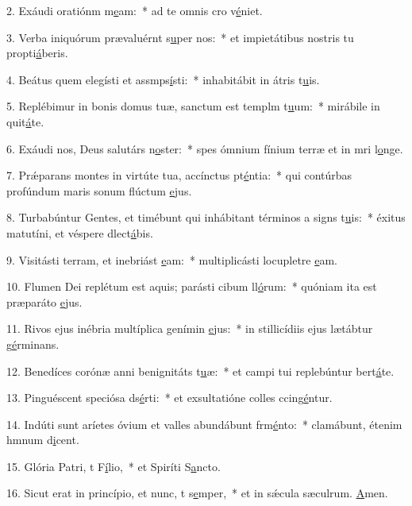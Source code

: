 2. Exáudi oratiónm m\uline{e}am:~* ad te omnis cro v\uline{é}niet.\par 
3. Verba iniquórum prævaluérnt s\uline{u}per nos:~* et impietátibus nostris tu propti\uline{á}beris.\par 
4. Beátus quem elegísti et assmps\uline{í}sti:~* inhabitábit in átris t\uline{u}is.\par 
5. Replébimur in bonis domus tuæ, sanctum est templm t\uline{u}um:~* mirábile in quit\uline{á}te.\par 
6. Exáudi nos, Deus salutárs n\uline{o}ster:~* spes ómnium fínium terræ et in mri l\uline{o}nge.\par 
7. Prǽparans montes in virtúte tua, accínctus pt\uline{é}ntia:~* qui contúrbas profúndum maris sonum flúctum \uline{e}jus.\par 
8. Turbabúntur Gentes, et timébunt qui inhábitant términos a signs t\uline{u}is:~* éxitus matutíni, et véspere dlect\uline{á}bis.\par 
9. Visitásti terram, et inebriást \uline{e}am:~* multiplicásti locupletre \uline{e}am.\par 
10. Flumen Dei replétum est aquis; parásti cibum ll\uline{ó}rum:~* quóniam ita est præparáto \uline{e}jus.\par 
11. Rivos ejus inébria multíplica genímin \uline{e}jus:~* in stillicídiis ejus lætábtur g\uline{é}rminans.\par 
12. Benedíces corónæ anni benignitáts t\uline{u}æ:~* et campi tui replebúntur bert\uline{á}te.\par 
13. Pinguéscent speciósa ds\uline{é}rti:~* et exsultatióne colles ccing\uline{é}ntur.\par 
14. Indúti sunt aríetes óvium et valles abundábunt frm\uline{é}nto:~* clamábunt, étenim hmnum d\uline{i}cent.\par 
15. Glória Patri, t F\uline{í}lio,~* et Spiríti S\uline{a}ncto.\par 
16. Sicut erat in princípio, et nunc, t s\uline{e}mper,~* et in sǽcula sæculrum. \uline{A}men.\par 
